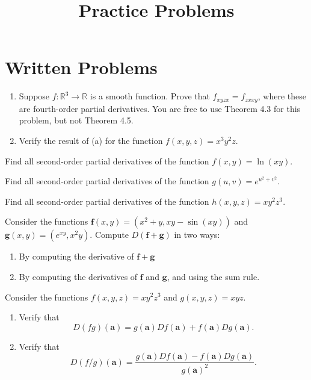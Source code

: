 \documentclass{ximera}
\title{Practice Problems}
\begin{document}
\begin{abstract}
\end{abstract}
\maketitle
\section{Written Problems}
\begin{problem}
\begin{enumerate}
\item Suppose $f:\mathbb{R}^3\rightarrow\mathbb{R}$ is a smooth function. Prove that $f_{xyzx} = f_{zxxy}$, where these are fourth-order partial derivatives. You are free to use Theorem 4.3 for this problem, but not Theorem 4.5.
\item Verify the result of (a) for the function $f(x,y,z) = x^3y^2z$.
\end{enumerate}
\end{problem}

\begin{problem}
Find all second-order partial derivatives of the function $f(x,y) = \ln(xy)$.
\end{problem}

\begin{problem}
Find all second-order partial derivatives of the function $g(u, v) = e^{u^2+v^2}$.
\end{problem}

\begin{problem}
Find all second-order partial derivatives of the function $h(x,y,z) = xy^2z^3$.
\end{problem}

\begin{problem}
Consider the functions $\mathbf{f}(x,y) = (x^2+y, xy-\sin(xy))$ and $\mathbf{g}(x,y) = (e^{xy}, x^2y)$. Compute $D(\mathbf{f} + \mathbf{g})$ in two ways:
\begin{enumerate}
\item By computing the derivative of $\mathbf{f} + \mathbf{g}$
\item By computing the derivatives of $\mathbf{f}$ and $\mathbf{g}$, and using the sum rule.
\end{enumerate}
\end{problem}

\begin{problem}
Consider the functions $f(x,y,z) = xy^2z^3$ and $g(x,y,z) = xyz$.
\begin{enumerate}
\item Verify that \[D(fg)(\mathbf{a})=g(\mathbf{a})Df(\mathbf{a})+f(\mathbf{a})Dg(\mathbf{a}).\]
\item Verify that \[D(f/g)(\mathbf{a})=\frac{g(\mathbf{a})Df(\mathbf{a})-f(\mathbf{a})Dg(\mathbf{a})}{g(\mathbf{a})^2}.\]
\end{enumerate}
\end{problem}
\end{document}
